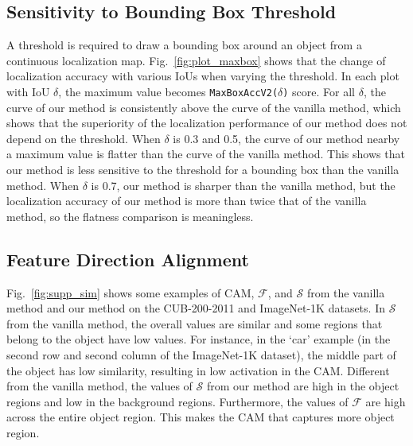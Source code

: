 

\subsection{Sensitivity to Bounding Box Threshold}
A threshold is required to draw a bounding box around an object from a continuous localization map. Fig.~\ref{fig:plot_maxbox} shows that the change of localization accuracy with various IoUs when varying the threshold. In each plot with IoU $\delta$, the maximum value becomes \texttt{MaxBoxAccV2($\delta$)} score. For all $\delta$, the curve of our method is consistently above the curve of the vanilla method, which shows that the superiority of the localization performance of our method does not depend on the threshold. When $\delta$ is 0.3 and 0.5, the curve of our method nearby a maximum value is flatter than the curve of the vanilla method. This shows that our method is less sensitive to the threshold for a bounding box than the vanilla method. When $\delta$ is 0.7, our method is sharper than the vanilla method, but the localization accuracy of our method is more than twice that of the vanilla method, so the flatness comparison is meaningless.

\subsection{Feature Direction Alignment}
Fig.~\ref{fig:supp_sim} shows some examples of CAM, $\mathcal{F}$, and $\mathcal{S}$ from the vanilla method and our method on the CUB-200-2011 and ImageNet-1K datasets. In $\mathcal{S}$ from the vanilla method, the overall values are similar and some regions that belong to the object have low values. For instance, in the `car' example (in the second row and second column of the ImageNet-1K dataset), the middle part of the object has low similarity, resulting in low activation in the CAM. Different from the vanilla method, the values of $\mathcal{S}$ from our method are high in the object regions and low in the background regions. Furthermore, the values of $\mathcal{F}$ are high across the entire object region. This makes the CAM that captures more object region.

